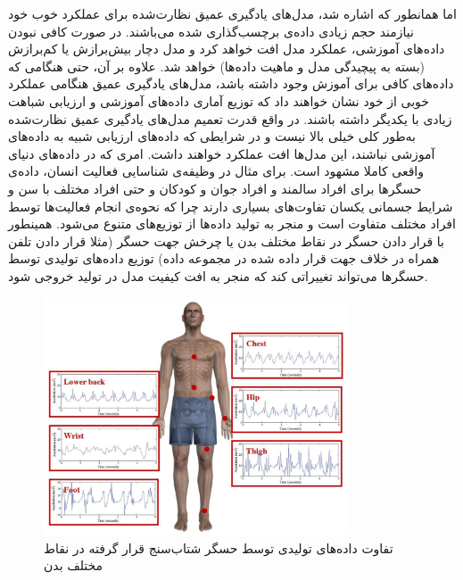 اما همانطور که اشاره شد، مدل‌های یادگیری عمیق
نظارت‌شده
برای عملکرد خوب خود نیازمند حجم زیادی داده‌ی برچسب‌گذاری شده می‌باشند. در صورت کافی نبودن داده‌های آموزشی، عملکرد مدل افت خواهد کرد و مدل دچار
بیش‌برازش
یا کم‌برازش
(بسته به پیچیدگی مدل و ماهیت داده‌ها)
خواهد شد. علاوه بر آن، حتی هنگامی که داده‌های کافی برای آموزش وجود داشته باشد، مدل‌های یادگیری عمیق هنگامی عملکرد خوبی از خود نشان خواهند داد که توزیع آماری داده‌های آموزشی و ارزیابی شباهت زیادی با یکدیگر داشته باشند. در واقع
قدرت تعمیم
مدل‌های یادگیری عمیق نظارت‌شده به‌طور کلی خیلی بالا نیست و در شرایطی که داده‌های ارزیابی شبیه به داده‌های آموزشی نباشند، این مدل‌ها افت عملکرد خواهند داشت\cite{recht2019imagenet}.
امری که در داده‌های دنیای واقعی کاملا مشهود است. برای مثال در وظیفه‌ی شناسایی فعالیت انسان، داده‌ی حسگرها برای افراد سالمند و افراد جوان و کودکان و حتی افراد مختلف با سن و شرایط جسمانی یکسان تفاوت‌های بسیاری دارند چرا که نحوه‌ی انجام فعالیت‌ها توسط افراد مختلف متفاوت است و منجر به تولید داده‌ها از توزیع‌های متنوع می‌شود. همینطور با قرار دادن حسگر در نقاط مختلف بدن یا چرخش جهت حسگر (مثلا قرار دادن تلفن همراه در خلاف جهت قرار داده شده در مجموعه داده) توزیع داده‌های تولیدی توسط حسگرها می‌تواند تغییراتی کند که منجر به افت کیفیت مدل در تولید خروجی شود\cite{cleland2013optimal}.
\begin{figure}[htbp]
  \centering
  \includegraphics[width=0.8\textwidth]{Images/Chapter1/accelerometer-placement.png}
  \caption{تفاوت داده‌های تولیدی توسط حسگر شتاب‌سنج قرار گرفته در نقاط مختلف بدن}
  \label{fig:accelerometer-placement}
\end{figure}

